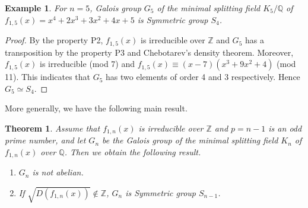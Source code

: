 \documentclass{article}
\newtheorem{thm}{Theorem}[section]
\newtheorem{exam}{Example}[section]
\begin{document}
\begin{exam}
\upshape
For $n=5$, Galois group $G_{5}$ of the minimal splitting field $K_{5}/\mathbb{Q}$ of $f_{1,5}(x) = x^4 + 2x^3 + 3x^2 + 4x + 5$ is Symmetric group $S_{4}$.
\end{exam}

\begin{proof}
By the property P2, $f_{1,5}(x)$ is irreducible over $\mathbb{Z}$ and $G_{5}$ has a transposition by the property P3 and Chebotarev's density theorem. Moreover, $f_{1,5}(x)$ is irreducible (mod 7) and $f_{1,5}(x)\equiv (x-7)(x^3 + 9x^2 + 4)$ (mod 11). This indicates that $G_{5}$ has two elements of order 4 and 3 respectively. Hence $G_{5}\simeq S_{4}$. 
\end{proof}

More generally, we have the following main result.
\begin{thm}
\upshape
Assume that  $f_{1,n}(x)$ is irreducible over $\mathbb{Z}$ and $p = n-1$ is an odd prime number, and let $G_{n}$ be the Galois group of the minimal splitting field $K_{n}$ of $f_{1,n}(x)$ over $\mathbb{Q}$. Then we obtain the following result.
\begin{enumerate}
	\item[(1)] $G_{n}$ is not abelian.
	\item[(2)] If $\sqrt{D(f_{1,n}(x))}\notin\mathbb{Z}$, $G_{n}$ is Symmetric group $S_{n-1}$.
\end{enumerate}
\end{thm}
\end{document}
